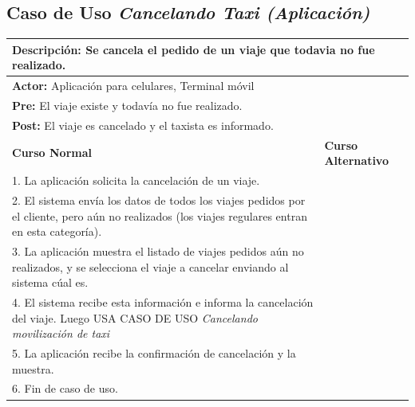 \documentclass[a4paper]{article}
\begin{document}
\subsection{Caso de Uso \textit{Cancelando Taxi (Aplicaci\'on)}}
\begin{center}
\begin{tabular}{|p{10cm} | p{6cm}|}
\hline
\multicolumn{2}{|p{16cm}|}{\textbf{Descripci\'on:} Se cancela el pedido de un viaje que todavia no fue realizado.} \\
\hline
\multicolumn{2}{|l|}{\textbf{Actor:} Aplicaci\'on para celulares, Terminal m\'ovil} \\ %
\hline
\multicolumn{2}{|p{15cm}|}{\textbf{Pre:} El viaje existe y todav\'ia no fue realizado. } \\
\hline
\multicolumn{2}{|p{15cm}|}{\textbf{Post:} El viaje es cancelado y el taxista es informado.}\\
\hline
\textbf{Curso Normal}  & \textbf{Curso Alternativo} \\ \hline
1. La aplicaci\'on solicita la cancelaci\'on de un viaje. & \\ \hline
2. El sistema env\'ia los datos de todos los viajes pedidos por el cliente, pero a\'un no realizados (los viajes regulares entran en esta categor\'ia). & \\ \hline
3. La aplicaci\'on muestra el listado de viajes pedidos a\'un no realizados, y se selecciona el viaje a cancelar enviando al sistema c\'ual es. & \\ \hline
4. El sistema recibe esta informaci\'on e informa la cancelaci\'on del viaje. Luego USA CASO DE USO \textit{Cancelando movilizaci\'on de taxi} & \\ \hline %
5. La aplicaci\'on recibe la confirmaci\'on de cancelaci\'on y la muestra. & \\ \hline
6. Fin de caso de uso. & \\ \hline
\end{tabular}
\end{center}
\end{document}
